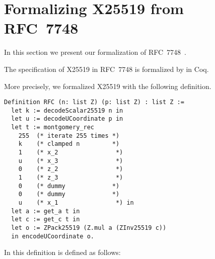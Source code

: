\section{Formalizing X25519 from RFC~7748}
\label{sec:Coq-RFC}

In this section we present our formalization of RFC~7748~\cite{rfc7748}.

\begin{informaltheorem}
The specification of X25519 in RFC~7748 is formalized by  in Coq.
\end{informaltheorem}

More precisely, we formalized X25519 with the following definition.
\begin{lstlisting}[language=Coq]
Definition RFC (n: list Z) (p: list Z) : list Z :=
  let k := decodeScalar25519 n in
  let u := decodeUCoordinate p in
  let t := montgomery_rec
    255  (* iterate 255 times *)
    k    (* clamped n         *)
    1    (* x_2                *)
    u    (* x_3                *)
    0    (* z_2                *)
    1    (* z_3                *)
    0    (* dummy             *)
    0    (* dummy             *)
    u    (* x_1                *) in
  let a := get_a t in
  let c := get_c t in
  let o := ZPack25519 (Z.mul a (ZInv25519 c))
  in encodeUCoordinate o.
\end{lstlisting}

In this definition  is defined as follows:

